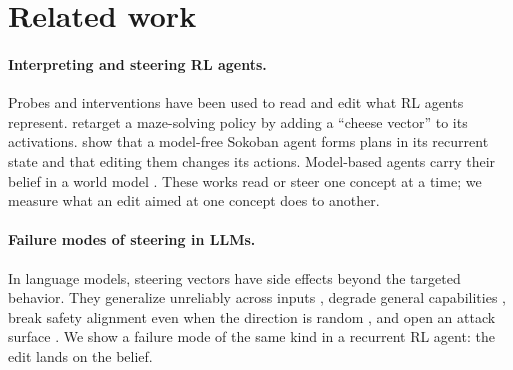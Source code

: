 \section{Related work}
\paragraph{Interpreting and steering RL agents.}
Probes and interventions have been used to read and edit what RL agents
represent. \citet{mini2023maze} retarget a maze-solving policy by adding a
``cheese vector'' to its activations. \citet{bush2025planning} show that a
model-free Sokoban agent forms plans in its recurrent state and that editing
them changes its actions. Model-based agents carry their belief in a world
model \citep{hafner2023dreamerv3}. These works read or steer one concept at a
time; we measure what an edit aimed at one concept does to another.

\paragraph{Failure modes of steering in LLMs.}
In language models, steering vectors have side effects beyond the targeted
behavior. They generalize unreliably across inputs \citep{tan2024reliability},
degrade general capabilities \citep{stickland2024sideeffects}, break safety
alignment even when the direction is random \citep{korznikov2025rogue}, and
open an attack surface \citep{aidakhmetov2026steering}. We show a failure mode
of the same kind in a recurrent RL agent: the edit lands on the belief.
